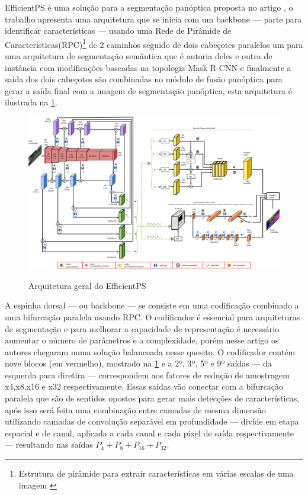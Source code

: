 
EfficientPS é uma solução para a segmentação panóptica proposta no artigo , o trabalho apresenta uma arquitetura que se inicia com um backbone — parte para identificar características — usando uma Rede de Pirâmide de Características(RPC)\footnote{Estrutura de pirâmide para extrair características em várias escalas de uma imagem \cite{piramide}} de 2 caminhos seguido de dois cabeçotes paralelos um para uma arquitetura de segmentação semântica que é autoria deles e outra de instância com modificações baseadas na topologia Mask R-CNN e finalmente a saída dos dois cabeçotes são combinadas no módulo de fusão panóptica para gerar a saída final com a imagem de segmentação panóptica, esta arquitetura é ilustrada na \cref{fig:arqEP}.

\begin{figure}[ht]
	\caption{Arquitetura geral do EfficientPS}
	\centering %
	\includegraphics[width=15cm]{figures/arqEP.jpg} %
	\label{fig:arqEP}
\end{figure}


A espinha dorsal — ou backbone — se consiste em uma codificação combinado a uma bifurcação paralela usando RPC. O codificador é essencial para arquiteturas de segmentação e para melhorar a capacidade de representação é necessário aumentar o número de parâmetros e a complexidade, porém nesse artigo os autores chegaram numa solução balanceada nesse quesito. O codificador contém nove blocos (em vermelho), mostrado na \cref{fig:arqEP} e a 2º, 3º, 5º e 9º saídas — da esquerda para diretira — correspondem aos fatores de redução de amostragem x4,x8,x16 e x32 respectivamente. Essas saídas vão conectar com a bifurcação paralela que são de sentidos opostos para gerar mais detecções de características, após isso será feita uma combinação entre camadas de mesma dimensão utilizando camadas de convolução separável em profundidade — divide em etapa espacial e de canal, aplicada a cada canal e cada pixel de saída respectivamente — resultando nas saídas $ P_4 + P_8 + P_{16} + P_{32} $\cite{mohan2020efficientps, redes-neurais-convolucionais-separaveis-em-profundidade}.

